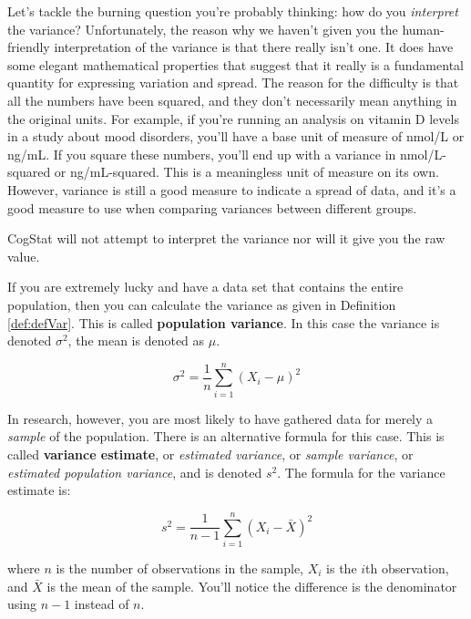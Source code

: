 \documentclass[
  11pt,
  a4paper,
  twoside,symmetric,openright]{book}
\theoremstyle{break}
\theoremstyle{break}
\begin{document}
Let's tackle the burning question you're probably thinking: how do you \emph{interpret} the variance? Unfortunately, the reason why we haven't given you the human-friendly interpretation of the variance is that there really isn't one. It does have some elegant mathematical properties that suggest that it really is a fundamental quantity for expressing variation and spread. The reason for the difficulty is that all the numbers have been squared, and they don't necessarily mean anything in the original units. For example, if you're running an analysis on vitamin D levels in a study about mood disorders, you'll have a base unit of measure of nmol/L or ng/mL. If you square these numbers, you'll end up with a variance in nmol/L-squared or ng/mL-squared. This is a meaningless unit of measure on its own. However, variance is still a good measure to indicate a spread of data, and it's a good measure to use when comparing variances between different groups.

CogStat will not attempt to interpret the variance nor will it give you the raw value.

\hypertarget{calloutVar}{}
\begin{callout}

\begin{keepTogether}
If you are extremely lucky and have a data set that contains the entire population, then you can calculate the variance as given in Definition \ref{def:defVar}. This is called \textbf{population variance}. In this case the variance is denoted \(\sigma^2\), the mean is denoted as \(\mu\).

\[
\sigma^2 = \frac{1}{n} \sum_{i=1}^n (X_i - \mu)^2
\]

\end{keepTogether}

\begin{keepTogether}
In research, however, you are most likely to have gathered data for merely a \emph{sample} of the population. There is an alternative formula for this case. This is called \textbf{variance estimate}, or \emph{estimated variance}, or \emph{sample variance}, or \emph{estimated population variance}, and is denoted \(s^2\). The formula for the variance estimate is:

\[
s^2 = \frac{1}{n-1} \sum_{i=1}^n (X_i - \bar{X})^2
\]

where \(n\) is the number of observations in the sample, \(X_i\) is the \(i\)th observation, and \(\bar{X}\) is the mean of the sample. You'll notice the difference is the denominator using \(n-1\) instead of \(n\).

\end{keepTogether}

\end{callout}
\end{document}
